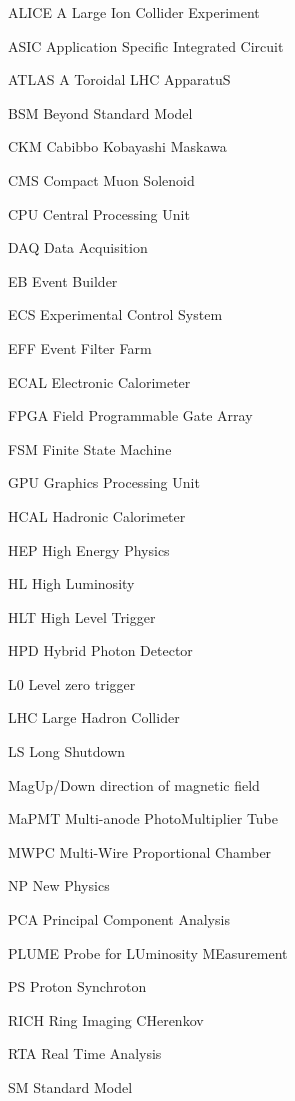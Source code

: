 \begin{abbreviations}
    \item[ALICE] A Large Ion Collider Experiment
    \item[ASIC] Application Specific Integrated Circuit
    \item[ATLAS] A Toroidal LHC ApparatuS
    \item[BSM] Beyond Standard Model
    \item[CKM] Cabibbo Kobayashi Maskawa
    \item[CMS] Compact Muon Solenoid
    \item[CPU] Central Processing Unit
    \item[DAQ] Data Acquisition
    \item[EB] Event Builder
    \item[ECS] Experimental Control System
    \item[EFF] Event Filter Farm
    \item[ECAL] Electronic Calorimeter
    \item[FPGA] Field Programmable Gate Array
    \item[FSM] Finite State Machine
    \item[GPU] Graphics Processing Unit
    \item[HCAL] Hadronic Calorimeter
    \item[HEP] High Energy Physics
    \item[HL] High Luminosity
    \item[HLT] High Level Trigger
    \item[HPD] Hybrid Photon Detector
    \item[L0] Level zero trigger
    \item[LHC] Large Hadron Collider
    \item[LS] Long Shutdown
    \item[MagUp/Down] direction of magnetic field
    \item[MaPMT] Multi-anode PhotoMultiplier Tube
    \item[MWPC] Multi-Wire Proportional Chamber
    \item[NP] New Physics
    \item[PCA] Principal Component Analysis
    \item[PLUME] Probe for LUminosity MEasurement
    \item[PS] Proton Synchroton
    \item[RICH] Ring Imaging CHerenkov
    \item[RTA] Real Time Analysis
    \item[SM] Standard Model

\end{abbreviations}
